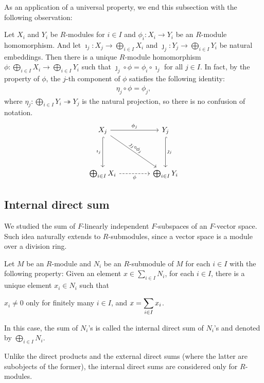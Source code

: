 As an application of a universal property, we end this subsection with the following observation:
\begin{obs}
    Let $X_i$ and $Y_i$ be $R$-modules for $i\in I$ and $\phi_i: X_i\rightarrow Y_i$ be an $R$-module homomorphism.
    And let $\imath_j: X_j\rightarrow \bigoplus_{i\in I} X_i$ and $\jmath_j: Y_j\rightarrow \bigoplus_{i\in I} Y_i$ be natural embeddings.
    Then there is a unique $R$-module homomorphism $\phi: \bigoplus_{i\in I} X_i\rightarrow \bigoplus_{i\in I} Y_i$ such that $\jmath_j\circ\phi=\phi_i\circ\imath_j$ for all $j\in I$.
    In fact, by the property of $\phi$, the $j$-th component of $\phi$ satisfies the following identity:
    \begin{align*}
        \eta_j\circ\phi=\phi_j,
    \end{align*}
    where $\eta_j:\bigoplus_{i\in I} Y_i\twoheadrightarrow Y_j$ is the natural projection, so there is no confusion of notation.
    \begin{equation*}
    \begin{tikzcd}[row sep=1.5cm, column sep=1.5cm]
        X_j
        \arrow[r, "\phi_j"]
        \arrow[d, "\imath_j"', hook]
        \arrow[dr, "\jmath_j\circ\phi_j"{sloped}]
        &
        Y_j
        \arrow[d, "\jmath_j", hook]
        \\
        \bigoplus_{i\in I} X_i
        \arrow[r, "\phi"', dashed]
        &
        \bigoplus_{i\in I} Y_i
    \end{tikzcd}
    \end{equation*}
\end{obs}


\subsection{Internal direct sum}

We studied the sum of $F$-linearly independent $F$-subspaces of an $F$-vector space.
Such idea naturally extends to $R$-submodules, since a vector space is a module over a division ring.
\begin{defi}
    Let $M$ be an $R$-module and $N_i$ be an $R$-submodule of $M$ for each $i\in I$ with the following property:
        Given an element $x\in\sum_{i\in I} N_i$, for each $i\in I$, there is a unique element $x_i\in N_i$ such that
        \begin{center}
            $x_i\neq 0$ only for finitely many $i\in I$, and $\displaystyle{x=\sum_{i\in I} x_i}$.
        \end{center}
    In this case, the sum of $N_i$'s is called the internal direct sum of $N_i$'s and denoted by $\bigoplus_{i\in I} N_i$.
\end{defi}
Unlike the direct products and the external direct sums (where the latter are subobjects of the former), the internal direct sums are considered only for $R$-modules.

